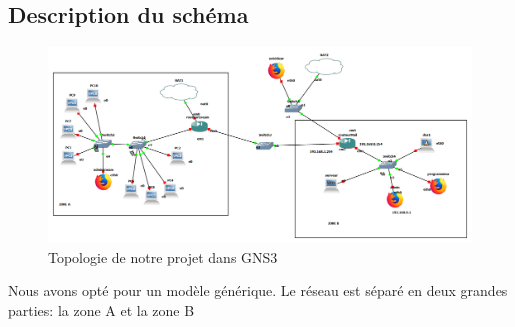 \documentclass[a4paper,12pt,french]{report} %
\begin{document}
\subsection{Description du schéma}
\begin{figure}[H]
\includegraphics[width=520pt]{figure/topologie_gns3.png}
\centering
\caption{Topologie de notre projet dans GNS3}	
\end{figure}	
Nous avons opté pour un modèle générique. Le réseau est séparé en deux grandes parties: la zone A et la zone B
\end{document}
